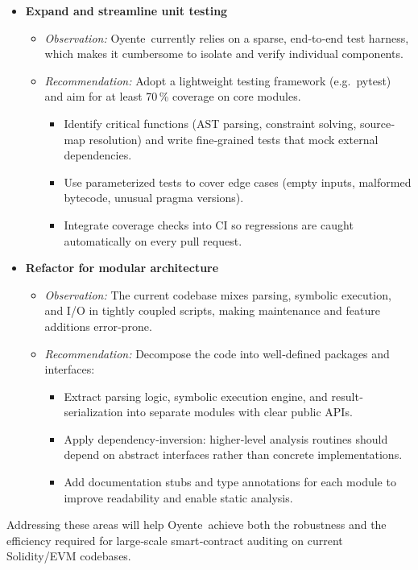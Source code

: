 \documentclass{article}
\newcommand\OY{Oyente}
\newcommand\OYp{\OY\raisebox{0.3ex}{\smaller +}}
\begin{document}
\begin{itemize}
		\item \textbf{Expand and streamline unit testing}
		\begin{itemize}
			\item \emph{Observation:}
			\OYp\ currently relies on a sparse, end‐to‐end test harness, which makes it cumbersome to isolate and verify individual components.
			\item \emph{Recommendation:}
			Adopt a lightweight testing framework (e.g.\ pytest) and aim for at least 70\,\% coverage on core modules.
			\begin{itemize}
				\item Identify critical functions (AST parsing, constraint solving, source‐map resolution) and write fine‐grained tests that mock external dependencies.
				\item Use parameterized tests to cover edge cases (empty inputs, malformed bytecode, unusual pragma versions).
				\item Integrate coverage checks into CI so regressions are caught automatically on every pull request.
			\end{itemize}
		\end{itemize}

		\item \textbf{Refactor for modular architecture}
		\begin{itemize}
			\item \emph{Observation:}
			The current codebase mixes parsing, symbolic execution, and I/O in tightly coupled scripts, making maintenance and feature additions error‐prone.
			\item \emph{Recommendation:}
			Decompose the code into well‐defined packages and interfaces:
			\begin{itemize}
				\item Extract parsing logic, symbolic execution engine, and result‐serialization into separate modules with clear public APIs.
				\item Apply dependency‐inversion: higher‐level analysis routines should depend on abstract interfaces rather than concrete implementations.
				\item Add documentation stubs and type annotations for each module to improve readability and enable static analysis.
			\end{itemize}
		\end{itemize}
	\end{itemize}

	Addressing these areas will help \OYp\ achieve both the robustness and the efficiency required for large‐scale smart‐contract auditing on current Solidity/EVM codebases.
\end{document}
